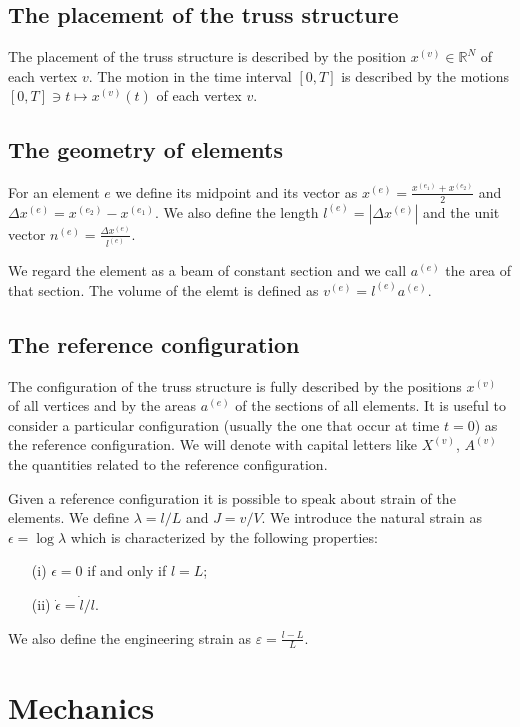 \documentclass[a4paper,11pt]{article}
\theoremstyle{definition}
\begin{document}
\subsection*{The placement of the truss structure}

The placement of the truss structure is described by the position $x^{(v)}\in\mathbb{R}^N$ of each vertex $v$. The motion in the time interval $[0,T]$ is described by the motions $[0,T]\ni t\mapsto x^{(v)}(t)$ of each vertex $v$.

\subsection*{The geometry of elements}

For an element $e$ we define its midpoint and its vector as $x^{(e)}=\frac{x^{(e_1)}+x^{(e_2)}}{2}$ and $\Delta x^{(e)}=x^{(e_2)}-x^{(e_1)}$. We also define the length $l^{(e)}=|\Delta x^{(e)}|$ and the unit vector $n^{(e)}=\frac{\Delta x^{(e)}}{l^{(e)}}$.

We regard the element as a beam of constant section and we call $a^{(e)}$ the area of that section. The volume of the elemt is defined as $v^{(e)}=l^{(e)}a^{(e)}$.

\subsection*{The reference configuration}

The configuration of the truss structure is fully described by the positions $x^{(v)}$ of all vertices and by the areas $a^{(e)}$ of the sections of all elements. It is useful to consider a particular configuration (usually the one that occur at time $t=0$) as the reference configuration. We will denote with capital letters like $X^{(v)}$, $A^{(v)}$ the quantities related to the reference configuration.

Given a reference configuration it is possible to speak about strain of the elements. We define $\lambda=l/L$ and $J=v/V$. We introduce the natural strain as $\epsilon=\log\lambda$ which is characterized by the following properties:
\begin{itemize}
\item[(i)] $\epsilon=0$ if and only if $l=L$;
\item[(ii)] $\dot{\epsilon}=\dot{l}/l$.
\end{itemize}
We also define the engineering strain as $\varepsilon=\frac{l-L}{L}$.

\section{Mechanics}
\end{document}
